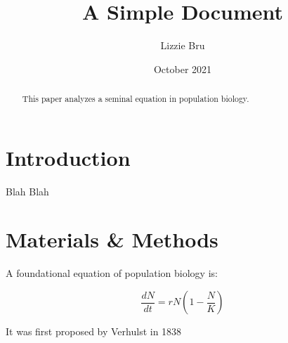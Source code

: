\documentclass[12pt]{article}
\title{A Simple Document}
\author{Lizzie Bru}
\date{October 2021}
\begin{document}
    \maketitle

    \begin{abstract}
    This paper analyzes a seminal equation in population biology.
    \end{abstract}

    \section{Introduction}
    Blah Blah

    \section{Materials \& Methods}
    
    A foundational equation of population biology is:

    \begin{equation}
        \frac{dN}{dt} = r N (1 - \frac{N}{K})
    \end{equation}

    It was first proposed by Verhulst in 1838 \cite{verhulst1838notice}

    

    
\end{document}
